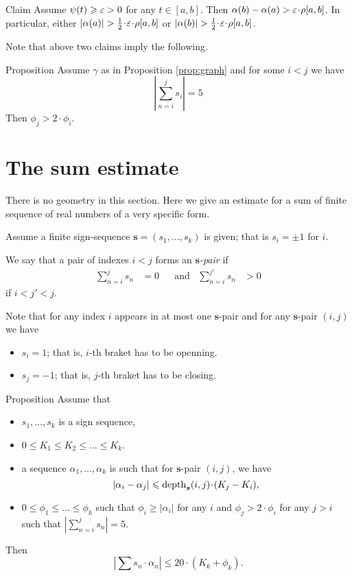 \documentclass[a4paper,10pt]{amsart}
\begin{document}
\begin{thm}{Claim}
Assume  
$\psi(t)\geqslant \varepsilon>0$ for any $t\in [a,b]$.
Then 
$\alpha(b)-\alpha(a)>\eps\cdot\rho[a,b]$.
In particular, either $|\alpha(a)|>\tfrac12\cdot\eps\cdot\rho[a,b]$ or $|\alpha(b)|>\tfrac12\cdot\eps\cdot\rho[a,b]$.
\end{thm}

Note that above two claims imply the following.

\begin{thm}{Proposition}
Assume $\gamma$ as in Proposition \ref{prop:graph}
and for some $i<j$ we have
\[\left|\sum_{n=i}^js_i\right|=5\]
Then $\phi_j>2\cdot\phi_i$.
\end{thm}



\section{The sum estimate}

There is no geometry in this section.
Here we give an estimate for a sum 
of finite sequence of real numbers 
of a very specific form.


Assume a finite  sign-sequence $\bm{s}=(s_1,\dots, s_k)$
is given;
that is $s_i=\pm1$ for $i$.

We say that a pair of indexes $i< j$
forms an \emph{$\bm{s}$-pair} 
if 
\begin{align*}
\sum_{n=i}^js_n&=0&&
\text{and}&
\sum_{n=i}^{j'}s_n&>0
\end{align*} 
if $i<j'<j$.

Note that for any index $i$ appears in at most one $\bm{s}$-pair and 
for any $\bm{s}$-pair $(i,j)$ we have
\begin{itemize}
\item $s_i=1$; that is, $i$-th braket has to be openning.
 \item $s_j=-1$; that is, $j$-th braket has to be closing.
\end{itemize}



\begin{thm}{Proposition}
Assume that
\begin{itemize}
\item $s_1,\dots, s_k$ is a sign sequence,
\item $0\le K_1\le K_2\le \dots\le K_k$.
\item a sequence $\alpha_1,\dots,\alpha_k$ is such that for $\bm{s}$-pair $(i,j)$, we have
\[|\alpha_i-\alpha_j|\le \depth_{\bm{s}}(i,j)\cdot(K_j-K_i),\]
\item $0\le \phi_1\le\dots\le\phi_k$ such that $\phi_i\ge |\alpha_i|$ for any $i$ and $\phi_j>2\cdot\phi_i$ for any $j>i$ such that $|\sum_{n=i}^js_n|=5$.
\end{itemize}
Then
\[|\sum s_n\cdot \alpha_n|\le 20\cdot( K_k+ \phi_k).\]

\end{thm}
\end{document}

